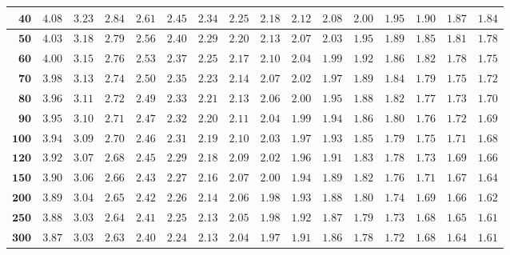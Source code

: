\begin{alternateColorTable}
\begin{longtable}{|r|r|r|r|r|r|r|r|r|r|r|r|r|r|r|r|}
    \(\mathbf{40}\) & \(4.08\) & \(3.23\) & \(2.84\) & \(2.61\) & \(2.45\) & \(2.34\) & \(2.25\) & \(2.18\) & \(2.12\) & \(2.08\) & \(2.00\) & \(1.95\) & \(1.90\) & \(1.87\) & \(1.84\) \\ \hline
    \(\mathbf{50}\) & \(4.03\) & \(3.18\) & \(2.79\) & \(2.56\) & \(2.40\) & \(2.29\) & \(2.20\) & \(2.13\) & \(2.07\) & \(2.03\) & \(1.95\) & \(1.89\) & \(1.85\) & \(1.81\) & \(1.78\) \\ \hline
    \(\mathbf{60}\) & \(4.00\) & \(3.15\) & \(2.76\) & \(2.53\) & \(2.37\) & \(2.25\) & \(2.17\) & \(2.10\) & \(2.04\) & \(1.99\) & \(1.92\) & \(1.86\) & \(1.82\) & \(1.78\) & \(1.75\) \\ \hline
    \(\mathbf{70}\) & \(3.98\) & \(3.13\) & \(2.74\) & \(2.50\) & \(2.35\) & \(2.23\) & \(2.14\) & \(2.07\) & \(2.02\) & \(1.97\) & \(1.89\) & \(1.84\) & \(1.79\) & \(1.75\) & \(1.72\) \\ \hline
    \(\mathbf{80}\) & \(3.96\) & \(3.11\) & \(2.72\) & \(2.49\) & \(2.33\) & \(2.21\) & \(2.13\) & \(2.06\) & \(2.00\) & \(1.95\) & \(1.88\) & \(1.82\) & \(1.77\) & \(1.73\) & \(1.70\) \\ \hline
    \(\mathbf{90}\) & \(3.95\) & \(3.10\) & \(2.71\) & \(2.47\) & \(2.32\) & \(2.20\) & \(2.11\) & \(2.04\) & \(1.99\) & \(1.94\) & \(1.86\) & \(1.80\) & \(1.76\) & \(1.72\) & \(1.69\) \\ \hline
    \(\mathbf{100}\) & \(3.94\) & \(3.09\) & \(2.70\) & \(2.46\) & \(2.31\) & \(2.19\) & \(2.10\) & \(2.03\) & \(1.97\) & \(1.93\) & \(1.85\) & \(1.79\) & \(1.75\) & \(1.71\) & \(1.68\) \\ \hline
    \(\mathbf{120}\) & \(3.92\) & \(3.07\) & \(2.68\) & \(2.45\) & \(2.29\) & \(2.18\) & \(2.09\) & \(2.02\) & \(1.96\) & \(1.91\) & \(1.83\) & \(1.78\) & \(1.73\) & \(1.69\) & \(1.66\) \\ \hline
    \(\mathbf{150}\) & \(3.90\) & \(3.06\) & \(2.66\) & \(2.43\) & \(2.27\) & \(2.16\) & \(2.07\) & \(2.00\) & \(1.94\) & \(1.89\) & \(1.82\) & \(1.76\) & \(1.71\) & \(1.67\) & \(1.64\) \\ \hline
    \(\mathbf{200}\) & \(3.89\) & \(3.04\) & \(2.65\) & \(2.42\) & \(2.26\) & \(2.14\) & \(2.06\) & \(1.98\) & \(1.93\) & \(1.88\) & \(1.80\) & \(1.74\) & \(1.69\) & \(1.66\) & \(1.62\) \\ \hline
    \(\mathbf{250}\) & \(3.88\) & \(3.03\) & \(2.64\) & \(2.41\) & \(2.25\) & \(2.13\) & \(2.05\) & \(1.98\) & \(1.92\) & \(1.87\) & \(1.79\) & \(1.73\) & \(1.68\) & \(1.65\) & \(1.61\) \\ \hline
    \(\mathbf{300}\) & \(3.87\) & \(3.03\) & \(2.63\) & \(2.40\) & \(2.24\) & \(2.13\) & \(2.04\) & \(1.97\) & \(1.91\) & \(1.86\) & \(1.78\) & \(1.72\) & \(1.68\) & \(1.64\) & \(1.61\) \\ \hline

\end{longtable}
\end{alternateColorTable}
